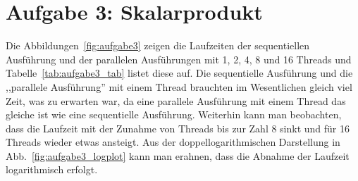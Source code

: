 \chapter{Aufgabe 3: Skalarprodukt}

Die Abbildungen~\ref{fig:aufgabe3} zeigen die Laufzeiten der sequentiellen Ausführung und der parallelen Ausführungen mit 1, 2, 4, 8 und 16 Threads und Tabelle~\ref{tab:aufgabe3_tab} listet diese auf. Die sequentielle Ausführung und die ,,parallele Ausführung'' mit einem Thread brauchten im Wesentlichen gleich viel Zeit, was zu erwarten war, da eine parallele Ausführung mit einem Thread das gleiche ist wie eine sequentielle Ausführung. Weiterhin kann man beobachten, dass die Laufzeit mit der Zunahme von Threads bis zur Zahl 8 sinkt und für 16 Threads wieder etwas ansteigt. Aus der doppellogarithmischen Darstellung in Abb.~\ref{fig:aufgabe3_logplot} kann man erahnen, dass die Abnahme der Laufzeit logarithmisch erfolgt.

